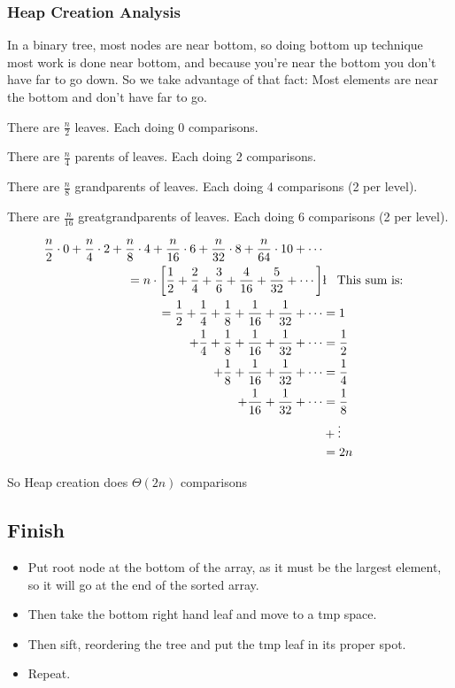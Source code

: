 \documentclass[english, 10pt]{article}
\begin{document}
\subsubsection{Heap Creation Analysis}
In a binary tree, most nodes are near bottom, so doing bottom up technique most
work is done near bottom, and because you're near the bottom you don't have far
to go down.  So we take advantage of that fact: Most elements are near the
bottom and don't have far to go.

There are $ \frac{n}{2}$ leaves. Each doing 0 comparisons.

There are $ \frac{n}{4}$ parents of leaves. Each doing 2 comparisons.

There are $ \frac{n}{8}$ grandparents of leaves. Each doing 4 comparisons (2 per level).

There are $ \frac{n}{16}$ greatgrandparents of leaves. Each doing 6 comparisons (2 per level).

\begin{align*}
\frac{n}{2}\cdot0 + \frac{n}{4}\cdot2 + \frac{n}{8}\cdot4 + \frac{n}{16}\cdot6 +\frac{n}{32}\cdot8 + \frac{n}{64}\cdot10 + \cdots \\
= n\cdot\left[ \frac{1}{2} + \frac{2}{4} + \frac{3}{6} + \frac{4}{16} + \frac{5}{32} + \cdots \right]&\l\;\;\;\text{This sum is:} \\
= \frac{1}{2}+\frac{1}{4}+\frac{1}{8}+\frac{1}{16}+\frac{1}{32}+\cdots &= 1 \\
+ \frac{1}{4}+\frac{1}{8}+\frac{1}{16}+\frac{1}{32}+\cdots &= \frac{1}{2} \\
+ \frac{1}{8}+\frac{1}{16}+\frac{1}{32}+\cdots &= \frac{1}{4} \\
+ \frac{1}{16}+\frac{1}{32}+\cdots &=\frac{1}{8} \\
&+\vdots \\
&=2n
\end{align*}

So Heap creation does $\Theta(2n)$ comparisons

\subsection{Finish}
\begin{itemize}
    \item Put root node at the bottom of the array, as it must be the largest element, so
        it will go at the end of the sorted array.
    \item Then take the bottom right hand leaf and move to a tmp space.
    \item Then sift, reordering the tree and put the tmp leaf in its proper spot.
    \item Repeat.
\end{itemize}
\end{document}
